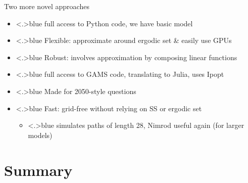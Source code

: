 \documentclass[handout,english]{beamer}
\begin{document}
\begin{frame}
  {Two more novel approaches}
  \begin{itemize}
    \item<+-|alert@+>{\color<.>{blue}
          {\color{patrickcolor3} full access to Python code}, we have basic model
        }
    \item<+-|alert@+>{\color<.>{blue}
          Flexible: approximate around ergodic set \& easily use GPUs
          }
    \item<+-|alert@+>{\color<.>{blue}
          Robust: involves approximation by composing linear functions
          }
        \end{itemize}
  \begin{itemize}
    \item<+-|alert@+>{\color<.>{blue}
          {\color{patrickcolor3} full access to GAMS code}, translating to Julia, uses Ipopt
          }
  \item<+-|alert@+>{\color<.>{blue}
          {\color{patrickcolor1} Made for 2050-style questions}
          }
    \item<+-|alert@+>{\color<.>{blue}
          Fast: grid-free without relying on SS or ergodic set
          }
          \begin{itemize}
    \item<+-|alert@+>{\color<.>{blue}
          simulates paths of length 28, Nimrod useful again (for larger models)
                  }
          \end{itemize}
        \end{itemize}
\end{frame}
\section{Summary}
\end{document}
